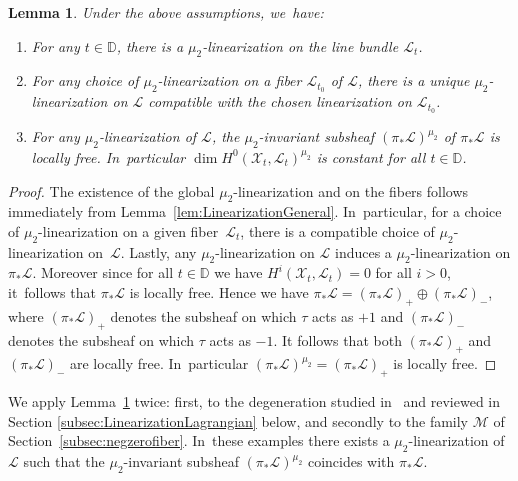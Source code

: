 \documentclass[11pt]{article}
\newenvironment{enumeratea}
{\bgroup\def\theenumi{\alph{enumi}}\begin{enumerate}}
{\end{enumerate}\egroup}
\newcommand{\DD}{{\mathbb D}}
\newcommand\cL{\mathcal{L}}
\newcommand\cM{\mathcal{M}}
\newtheorem{lemm}{Lemma}[section]
\theoremstyle{definition}
\begin{document}
\begin{lemm}\label{lem:LinearizationFamily}
Under the above assumptions, we~have:
\begin{enumeratea}
\item\label{enum:LinearizationFamily1} For any $t\in\DD$, there is a $\mu_2$-linearization on the line bundle $\mathcal{L}_t$.
\item For any choice of $\mu_2$-linearization on a fiber $\mathcal{L}_{t_0}$ of $\mathcal{L}$, there is a unique $\mu_2$\nobreakdash-linearization on $\mathcal{L}$ compatible with the chosen linearization on $\mathcal{L}_{t_0}$.
\item \label{eq:lemmconcl3} For any $\mu_2$-linearization of $\mathcal{L}$, the $\mu_2$-invariant subsheaf $(\pi_*\mathcal{L})^{\mu_2}$ of $\pi_*\mathcal{L}$ is locally free. In~particular $\dim H^0(\mathcal{X}_t,\mathcal{L}_t)^{\mu_2}$ is constant for all $t\in\DD$.
\end{enumeratea}
\end{lemm}

\begin{proof}
The existence of the global $\mu_2$-linearization and on the fibers follows immediately from Lemma~\ref{lem:LinearizationGeneral}. In~particular, for a choice of $\mu_2$-linearization on a given fiber~$\mathcal{L}_t$, there is a compatible choice of $\mu_2$-linearization on~$\mathcal{L}$.
Lastly, any $\mu_2$-linearization on $\mathcal{L}$ induces a $\mu_2$-linearization on $\pi_*\mathcal{L}$.
Moreover since for all $t\in \DD$ we have $H^i(\mathcal{X}_t,\mathcal{L}_t)=0$ for all $i>0$, it~follows that $\pi_*\mathcal{L}$ is locally free.
Hence we have $\pi_*\mathcal{L}=(\pi_*\mathcal{L})_+\oplus (\pi_*\mathcal{L})_-$, where $(\pi_*\mathcal{L})_+$ denotes the subsheaf on which $\tau$ acts as $+1$ and $(\pi_*\mathcal{L})_-$ denotes the subsheaf on which $\tau$ acts as $-1$.
It follows that both $(\pi_*\mathcal{L})_+$ and $(\pi_*\mathcal{L})_-$ are locally free. In~particular $(\pi_*\mathcal{L})^{\mu_2}=(\pi_*\mathcal{L})_+$ is locally free.
\end{proof}

We apply Lemma~\ref{lem:LinearizationFamily} twice: first, to the degeneration studied in~\cite{involutions1} and reviewed in Section \ref{subsec:LinearizationLagrangian} below, and secondly to the family $\cM$ of Section~\ref{subsec:negzerofiber}. In~these examples there exists a $\mu_2$-linearization of $\cL$ such that the $\mu_2$-invariant subsheaf $(\pi_*\mathcal{L})^{\mu_2}$ coincides with $\pi_*\mathcal{L}$.
\end{document}
